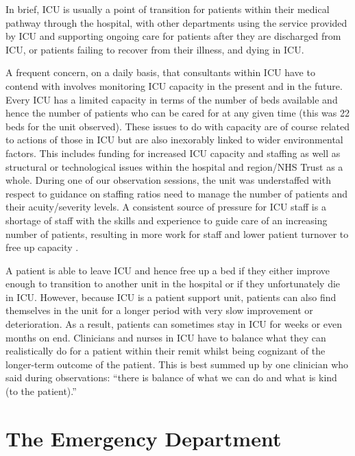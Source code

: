 \documentclass[a4paper, nobind]{templates/ociamthesis}
\begin{document}
\hfill\break
In brief, ICU is usually a point of transition for patients within their medical pathway through the hospital, with other departments using the service provided by ICU and supporting ongoing care for patients after they are discharged from ICU, or patients failing to recover from their illness, and dying in ICU.

\hfill\break
A frequent concern, on a daily basis, that consultants within ICU have to contend with involves monitoring ICU capacity in the present and in the future. Every ICU has a limited capacity in terms of the number of beds available and hence the number of patients who can be cared for at any given time (this was 22 beds for the unit observed). These issues to do with capacity are of course related to actions of those in ICU but are also inexorably linked to wider environmental factors. This includes funding for increased ICU capacity and staffing as well as structural or technological issues within the hospital and region/NHS Trust as a whole. During one of our observation sessions, the unit was understaffed with respect to guidance on staffing ratios need to manage the number of patients and their acuity/severity levels. A consistent source of pressure for ICU staff is a shortage of staff with the skills and experience to guide care of an increasing number of patients, resulting in more work for staff and lower patient turnover to free up capacity \autocite{page_strategies_2024}.

\hfill\break
A patient is able to leave ICU and hence free up a bed if they either improve enough to transition to another unit in the hospital or if they unfortunately die in ICU. However, because ICU is a patient support unit, patients can also find themselves in the unit for a longer period with very slow improvement or deterioration. As a result, patients can sometimes stay in ICU for weeks or even months on end. Clinicians and nurses in ICU have to balance what they can realistically do for a patient within their remit whilst being cognizant of the longer-term outcome of the patient. This is best summed up by one clinician who said during observations: ``there is balance of what we can do and what is kind (to the patient).''

\section{The Emergency Department}\label{the-emergency-department}
\end{document}
